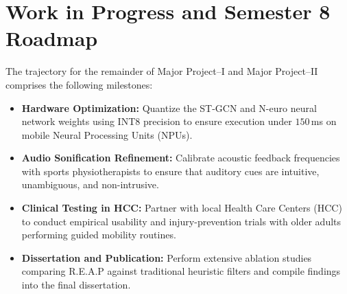 \documentclass[12pt,a4paper]{report}
\begin{document}
\section{Work in Progress and Semester 8 Roadmap}
The trajectory for the remainder of Major Project--I and Major Project--II comprises the following milestones:
\begin{itemize}[label=$\blacktriangleright$]
    \item \textbf{Hardware Optimization:} Quantize the ST-GCN and N-euro neural network weights using INT8 precision to ensure execution under $150$\,ms on mobile Neural Processing Units (NPUs).
    \item \textbf{Audio Sonification Refinement:} Calibrate acoustic feedback frequencies with sports physiotherapists to ensure that auditory cues are intuitive, unambiguous, and non-intrusive.
    \item \textbf{Clinical Testing in HCC:} Partner with local Health Care Centers (HCC) to conduct empirical usability and injury-prevention trials with older adults performing guided mobility routines.
    \item \textbf{Dissertation and Publication:} Perform extensive ablation studies comparing R.E.A.P against traditional heuristic filters and compile findings into the final dissertation.
\end{itemize}
\end{document}
